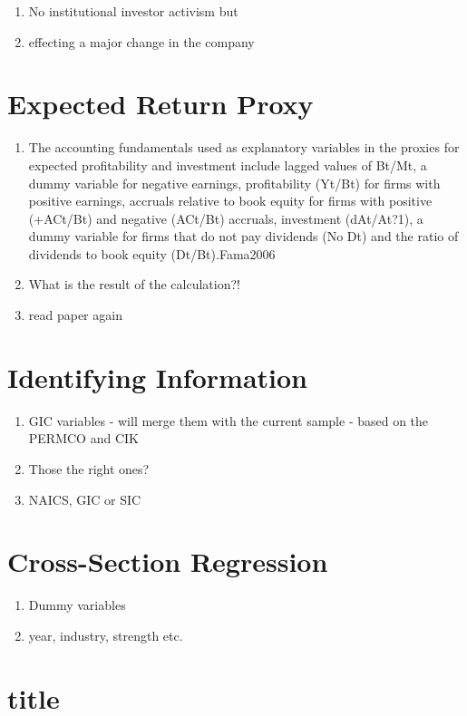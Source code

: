 \documentclass{article}
\begin{document}
  \begin{enumerate}
    \item No institutional investor activism but 
    \item effecting a major change in the company 
  \end{enumerate}

\section{Expected Return Proxy}

  \begin{enumerate}
    \item The accounting fundamentals used as explanatory variables in the proxies for expected profitability and investment include lagged values of Bt/Mt, a dummy variable for negative earnings, profitability (Yt/Bt) for firms with positive earnings, accruals relative to book
    equity for firms with positive (+ACt/Bt) and negative (ACt/Bt) accruals, investment (dAt/At?1), a dummy variable for firms that do not pay dividends (No Dt) and the ratio of dividends to book equity (Dt/Bt).{Fama2006}

    \item What is the result of the calculation?! 
    \item read paper again 
  \end{enumerate}

\section{Identifying Information}

\begin{enumerate}
  \item GIC variables - will merge them with the current sample - based on the PERMCO and CIK 
  \item Those the right ones? 
  \item NAICS, GIC or SIC
\end{enumerate}

\section{Cross-Section Regression}

\begin{enumerate}
  \item Dummy variables 
  \item year, industry, strength etc. 
\end{enumerate}

\section{title}
\end{document}

